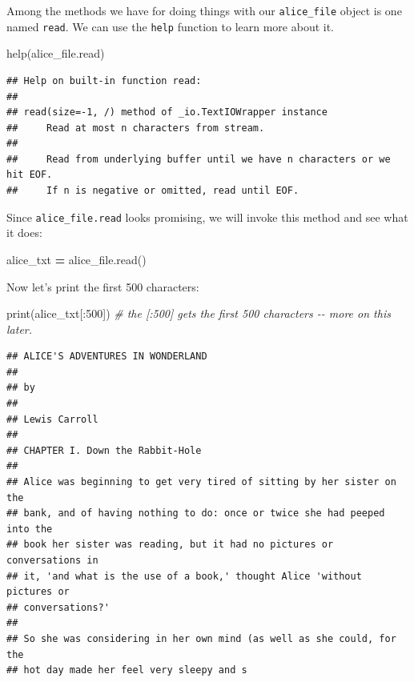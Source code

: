 \documentclass[
]{book}
\newenvironment{Shaded}{\begin{snugshade}}{\end{snugshade}}
\newcommand{\BuiltInTok}[1]{#1}
\newcommand{\CommentTok}[1]{\textcolor[rgb]{0.56,0.35,0.01}{\textit{#1}}}
\newcommand{\DecValTok}[1]{\textcolor[rgb]{0.00,0.00,0.81}{#1}}
\newcommand{\NormalTok}[1]{#1}
\newcommand{\OperatorTok}[1]{\textcolor[rgb]{0.81,0.36,0.00}{\textbf{#1}}}
\begin{document}
Among the methods we have for doing things with our \texttt{alice\_file} object is one named \texttt{read}. We can use the \texttt{help} function to learn more about it.

\begin{Shaded}
\begin{Highlighting}[]
\BuiltInTok{help}\NormalTok{(alice\_file.read)}
\end{Highlighting}
\end{Shaded}

\begin{verbatim}
## Help on built-in function read:
## 
## read(size=-1, /) method of _io.TextIOWrapper instance
##     Read at most n characters from stream.
##     
##     Read from underlying buffer until we have n characters or we hit EOF.
##     If n is negative or omitted, read until EOF.
\end{verbatim}

Since \texttt{alice\_file.read} looks promising, we will invoke this method and see what it does:

\begin{Shaded}
\begin{Highlighting}[]
\NormalTok{alice\_txt }\OperatorTok{=}\NormalTok{ alice\_file.read()}
\end{Highlighting}
\end{Shaded}

Now let's print the first 500 characters:

\begin{Shaded}
\begin{Highlighting}[]
\BuiltInTok{print}\NormalTok{(alice\_txt[:}\DecValTok{500}\NormalTok{]) }\CommentTok{\# the [:500] gets the first 500 characters {-}{-} more on this later.}
\end{Highlighting}
\end{Shaded}

\begin{verbatim}
## ﻿ALICE'S ADVENTURES IN WONDERLAND
## 
## by
## 
## Lewis Carroll
## 
## CHAPTER I. Down the Rabbit-Hole
## 
## Alice was beginning to get very tired of sitting by her sister on the
## bank, and of having nothing to do: once or twice she had peeped into the
## book her sister was reading, but it had no pictures or conversations in
## it, 'and what is the use of a book,' thought Alice 'without pictures or
## conversations?'
## 
## So she was considering in her own mind (as well as she could, for the
## hot day made her feel very sleepy and s
\end{verbatim}
\end{document}
